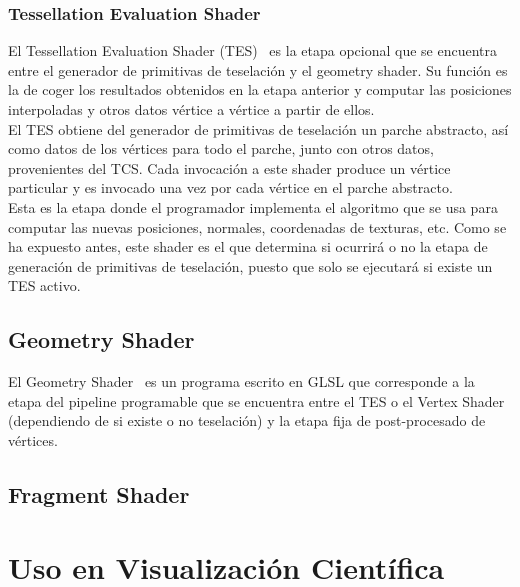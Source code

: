 \subsubsection{Tessellation Evaluation Shader}
\label{ref:TesEvaShader}

El Tessellation Evaluation Shader (TES)~\cite{TesEvaShader} es la etapa opcional
que se encuentra entre el generador de primitivas de teselación y el geometry
shader. Su función es la de coger los resultados obtenidos en la etapa anterior
y computar las posiciones interpoladas y otros datos vértice a vértice a partir
de ellos.\\

El TES obtiene del generador de primitivas de teselación un parche abstracto,
así como datos de los vértices para todo el parche, junto con otros datos,
provenientes del TCS. Cada invocación a este shader produce un vértice
particular y es invocado una vez por cada vértice en el parche abstracto.\\

Esta es la etapa donde el programador implementa el algoritmo que se usa para
computar las nuevas posiciones, normales, coordenadas de texturas, etc. Como se
ha expuesto antes, este shader es el que determina si ocurrirá o no la etapa de
generación de primitivas de teselación, puesto que solo se ejecutará si existe
un TES activo.\\

\subsection{Geometry Shader}
\label{ref:GeoShader}

El Geometry Shader~\cite{GeoShader} es un programa escrito en GLSL que
corresponde a la etapa del pipeline programable que se encuentra entre el TES o
el Vertex Shader (dependiendo de si existe o no teselación) y la etapa fija de
post-procesado de vértices.

\subsection{Fragment Shader}
\label{ref:FragShader}

\section{Uso en Visualización Científica}
\label{ref:SciVis}
